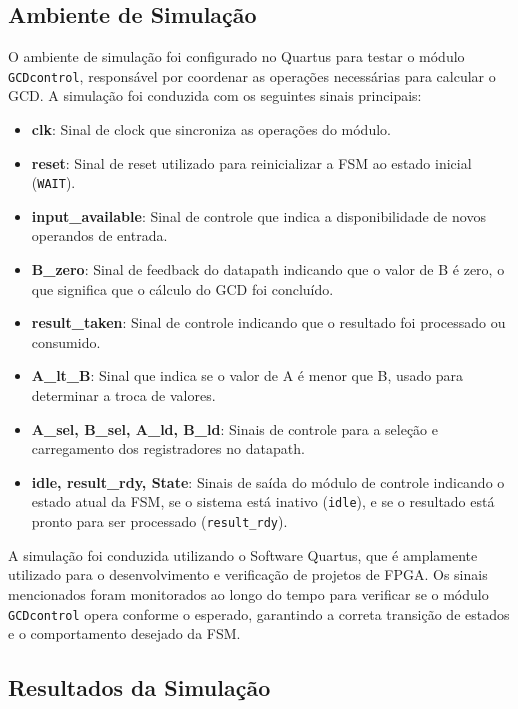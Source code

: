 \documentclass[a4paper,11pt]{article} %
\begin{document}
\subsection{Ambiente de Simulação}
O ambiente de simulação foi configurado no Quartus para testar o módulo \texttt{GCDcontrol}, responsável por coordenar as operações necessárias para calcular o GCD. A simulação foi conduzida com os seguintes sinais principais:
\begin{itemize}
    \item \textbf{clk}: Sinal de clock que sincroniza as operações do módulo.
    \item \textbf{reset}: Sinal de reset utilizado para reinicializar a FSM ao estado inicial (\texttt{WAIT}).
    \item \textbf{input\_available}: Sinal de controle que indica a disponibilidade de novos operandos de entrada.
    \item \textbf{B\_zero}: Sinal de feedback do datapath indicando que o valor de B é zero, o que significa que o cálculo do GCD foi concluído.
    \item \textbf{result\_taken}: Sinal de controle indicando que o resultado foi processado ou consumido.
    \item \textbf{A\_lt\_B}: Sinal que indica se o valor de A é menor que B, usado para determinar a troca de valores.
    \item \textbf{A\_sel, B\_sel, A\_ld, B\_ld}: Sinais de controle para a seleção e carregamento dos registradores no datapath.
    \item \textbf{idle, result\_rdy, State}: Sinais de saída do módulo de controle indicando o estado atual da FSM, se o sistema está inativo (\texttt{idle}), e se o resultado está pronto para ser processado (\texttt{result\_rdy}).
\end{itemize}

A simulação foi conduzida utilizando o Software Quartus, que é amplamente utilizado para o desenvolvimento e verificação de projetos de FPGA. Os sinais mencionados foram monitorados ao longo do tempo para verificar se o módulo \texttt{GCDcontrol} opera conforme o esperado, garantindo a correta transição de estados e o comportamento desejado da FSM.
\subsection{Resultados da Simulação}
\end{document}
